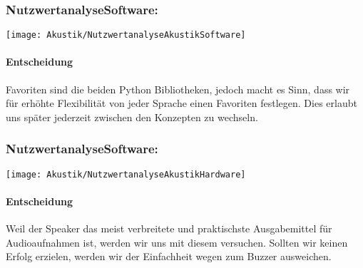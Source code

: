 \documentclass[../../main.tex]{subfiles}
\begin{document}
    \subsubsection{NutzwertanalyseSoftware:}
    \texttt{[image: Akustik/NutzwertanalyseAkustikSoftware]}
    \paragraph{Entscheidung}
    Favoriten sind die beiden Python Bibliotheken, jedoch macht es Sinn, dass wir für erhöhte Flexibilität von jeder Sprache einen Favoriten festlegen. Dies erlaubt uns später jederzeit zwischen den Konzepten zu wechseln.

    \subsubsection{NutzwertanalyseSoftware:}
    \texttt{[image: Akustik/NutzwertanalyseAkustikHardware]}
    \paragraph{Entscheidung}
    Weil der Speaker das meist verbreitete und praktischste Ausgabemittel für Audioaufnahmen ist, werden wir uns mit diesem versuchen.
    Sollten wir keinen Erfolg erzielen, werden wir der Einfachheit wegen zum Buzzer ausweichen.


  
\end{document}
